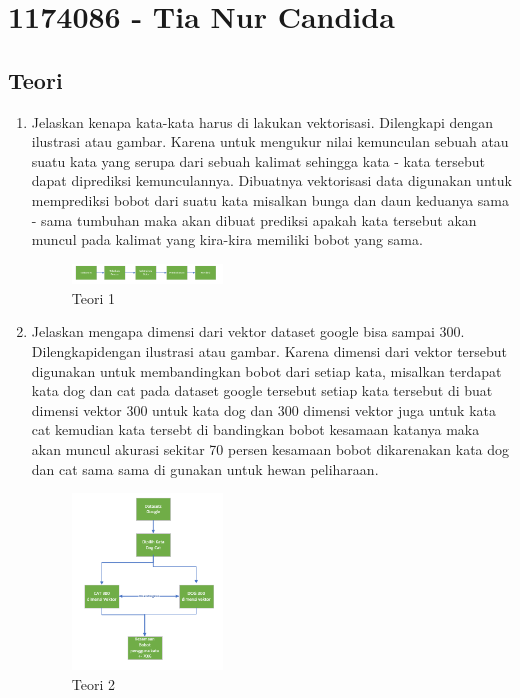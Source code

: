 \section{1174086 - Tia Nur Candida}
\subsection{Teori}
\begin{enumerate}
	\item Jelaskan kenapa kata-kata harus di lakukan vektorisasi. Dilengkapi dengan ilustrasi atau gambar.
	\hfill\break
	Karena untuk mengukur nilai kemunculan sebuah atau suatu kata yang serupa dari sebuah kalimat sehingga kata - kata tersebut dapat diprediksi kemunculannya. Dibuatnya vektorisasi data digunakan untuk memprediksi bobot dari suatu kata misalkan bunga dan daun keduanya sama - sama tumbuhan maka akan dibuat prediksi apakah kata tersebut akan muncul pada kalimat yang kira-kira memiliki bobot yang sama.
	
	\hfill\break
	\begin{figure}[H]
		\includegraphics[width=4cm]{figures/1174086/5/1.PNG}
		\centering
		\caption{Teori 1}
	\end{figure}

	\item Jelaskan mengapa dimensi dari vektor dataset google bisa sampai 300. Dilengkapidengan ilustrasi atau gambar.
	\hfill\break
	Karena dimensi dari vektor tersebut digunakan untuk membandingkan bobot dari setiap kata, misalkan terdapat kata dog dan cat pada dataset google tersebut setiap kata tersebut di buat dimensi vektor 300 untuk kata dog dan 300 dimensi vektor juga untuk kata cat kemudian kata tersebt di bandingkan bobot kesamaan katanya maka akan muncul akurasi sekitar 70 persen kesamaan bobot dikarenakan kata dog dan cat sama sama di gunakan untuk hewan peliharaan.
	\hfill\break
	\begin{figure}[H]
		\includegraphics[width=4cm]{figures/1174086/5/2.PNG}
		\centering
		\caption{Teori 2}
	\end{figure}


\end{enumerate}
